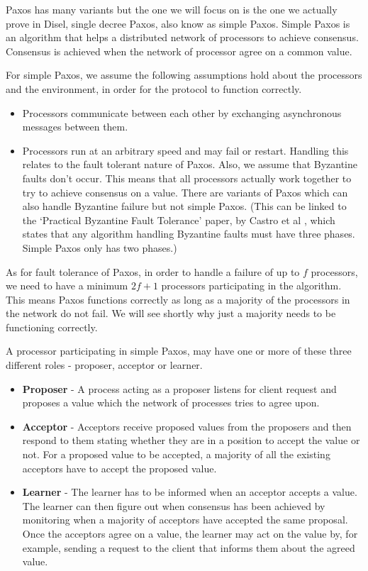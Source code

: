 Paxos has many variants but the one we will focus on is the one we actually prove
in Disel, single decree Paxos, also know as simple Paxos. Simple Paxos is an algorithm
that helps a distributed network of processors to achieve consensus.
Consensus is achieved when the network of processor agree on a common value.

For simple Paxos, we assume the following assumptions hold about the processors
and the environment, in order for the protocol to function correctly.
\begin{itemize}
  \item Processors communicate between each other by exchanging asynchronous messages between them.
  \item Processors run at an arbitrary speed and may fail or restart. Handling this relates
    to the fault tolerant nature of Paxos. Also, we assume that Byzantine faults don't occur.
    This means that all processors actually work together to try to achieve consensus on a value.
    There are variants of Paxos which can also handle Byzantine failure but not simple Paxos.
    (This can be linked to the `Practical Byzantine Fault Tolerance' paper, by Castro et al \cite{2},
    which states that any algorithm handling
    Byzantine faults must have three phases. Simple Paxos only has two phases.)
\end{itemize}

As for fault tolerance of Paxos, in order to handle a failure of up to $f$ processors,
we need to have a minimum $2f + 1$ processors participating in the algorithm. This
means Paxos functions correctly as long as a majority of the processors in the
network do not fail. We will see shortly why just a majority needs to be functioning
correctly.

A processor participating in simple Paxos, may have one or more of these three
different roles - proposer, acceptor or learner.
\begin{itemize}
  \item \textbf{Proposer} - A process acting as a proposer listens for client
    request and proposes a value which the network of processes tries to agree upon.
  \item \textbf{Acceptor} - Acceptors receive proposed values from the proposers
    and then respond to them stating whether they are in a position to accept the value or not.
    For a proposed value to be accepted, a majority of all the existing acceptors
    have to accept the proposed value.
  \item \textbf{Learner} - The learner has to be informed when an acceptor accepts a value.
    The learner can then figure out when consensus has been achieved by monitoring
    when a majority of acceptors have accepted the same proposal.
    Once the acceptors agree on a value, the learner may act on the value by,
    for example, sending a request to the client that informs them about the agreed value.
\end{itemize}

